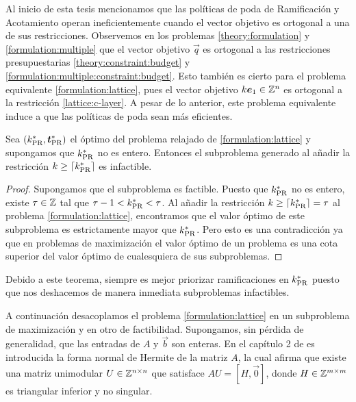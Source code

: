 Al inicio de esta tesis mencionamos que las políticas de poda de Ramificación y Acotamiento operan
ineficientemente cuando el vector objetivo es ortogonal a una de sus restricciones. Observemos
en los problemas \eqref{theory:formulation} y \eqref{formulation:multiple} que el vector objetivo
$\vec{q}$ es ortogonal a las restricciones presupuestarias \eqref{theory:constraint:budget} y
\eqref{formulation:multiple:constraint:budget}. Esto también es cierto para el problema
equivalente \eqref{formulation:lattice}, pues el vector objetivo $k\boldsymbol{e}_1 \in \mathbb{Z}^n$ es ortogonal
a la restricción \eqref{lattice:c-layer}. A pesar de lo anterior, este problema equivalente induce a
que las políticas de poda sean más eficientes.
\begin{theorem}
	\label{th:bbspeed}
	Sea $(k^*_{\text{PR}}, \boldsymbol{t}^*_{\text{PR}})$ el óptimo del problema relajado de \eqref{formulation:lattice}
	y supongamos que $k^*_{\text{PR}}$ no es entero. Entonces el subproblema generado al añadir la
	restricción $k \geq \left\lceil k^*_{\text{PR}} \right\rceil$ es infactible.
\end{theorem}
\begin{proof}
	Supongamos que el subproblema es factible. Puesto que $k^*_{\text{PR}}$ no es entero, existe $\tau \in
	\mathbb{Z}$ tal que $\tau - 1 < k^*_{\text{PR}} < \tau$. Al añadir la restricción $k \geq \left\lceil k^*_{\text{PR}} \right\rceil =
	\tau$ al problema \eqref{formulation:lattice}, encontramos que el valor óptimo de este
	subproblema es estrictamente mayor que $k^*_{\text{PR}}$. Pero esto es una contradicción ya que en
	problemas de maximización el valor óptimo de un problema es una cota superior del valor óptimo
	de cualesquiera de sus subproblemas.
\end{proof}
Debido a este teorema, siempre es mejor priorizar ramificaciones en $k^*_{\text{PR}}$ puesto que nos
deshacemos de manera inmediata subproblemas infactibles.

A continuación desacoplamos el problema \eqref{formulation:lattice} en un subproblema de
maximización y en otro de factibilidad. Supongamos, sin pérdida de generalidad, que las entradas de
$A$ y $\vec{b}$ son enteras. En el capítulo 2 de \cite{morris} es introducida la forma normal de
Hermite de la matriz $A$, la cual afirma que existe una matriz unimodular $U \in \mathbb{Z}^{n \times n}$
que satisface $AU = [H, \vec{0}]$, donde $H \in \mathbb{Z}^{m \times m}$ es triangular inferior y no
singular.

